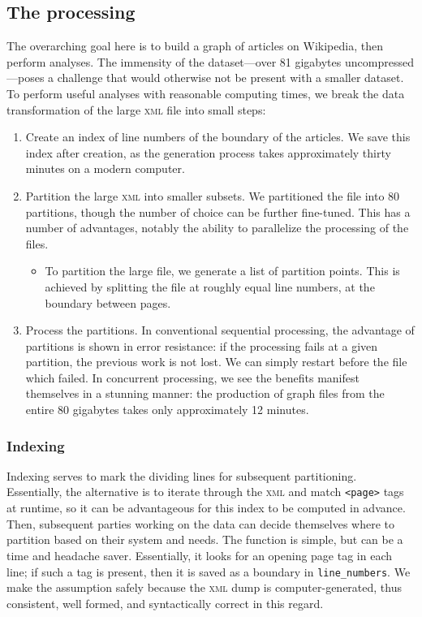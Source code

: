 \documentclass[fontsize=12pt]{article}
\begin{document}
\begin{multicols}{2}
    \subsection{The processing}
    The overarching goal here is to build a graph of articles on Wikipedia, then perform analyses.
    The immensity of the dataset---over 81 gigabytes uncompressed---poses a challenge that would otherwise not be present with a smaller dataset.
    To perform useful analyses with reasonable computing times, we break the data transformation of the large \textsc{xml} file into small steps:

    \begin{enumerate}
      \item Create an index of line numbers of the boundary of the articles.
            We save this index after creation, as the generation process takes approximately thirty minutes on a modern computer.
      \item Partition the large \textsc{xml} into smaller subsets.
            We partitioned the file into 80 partitions, though the number of choice can be further fine-tuned.
            This has a number of advantages, notably the ability to parallelize the processing of the files.
            \begin{itemize}
              \item To partition the large file, we generate a list of partition points.
                    This is achieved by splitting the file at roughly equal line numbers, at the boundary between pages.
            \end{itemize}
      \item Process the partitions.
            In conventional sequential processing, the advantage of partitions is shown in error resistance: if the processing fails at a given partition, the previous work is not lost.
            We can simply restart before the file which failed.
            In concurrent processing, we see the benefits manifest themselves in a stunning manner: the production of graph files from the entire 80 gigabytes takes only approximately 12 minutes.
    \end{enumerate}

    \subsubsection{Indexing}
    Indexing serves to mark the dividing lines for subsequent partitioning.
    Essentially, the alternative is to iterate through the \textsc{xml} and match \texttt{<page>} tags at runtime, so it can be advantageous for this index to be computed in advance.
    Then, subsequent parties working on the data can decide themselves where to partition based on their system and needs.
    The function is simple, but can be a time and headache saver.
    Essentially, it looks for an opening page tag in each line; if such a tag is present, then it is saved as a boundary in \texttt{line\_numbers}.
    We make the assumption safely because the \textsc{xml} dump is computer-generated, thus consistent, well formed, and syntactically correct in this regard.


\end{multicols}
\end{document}
